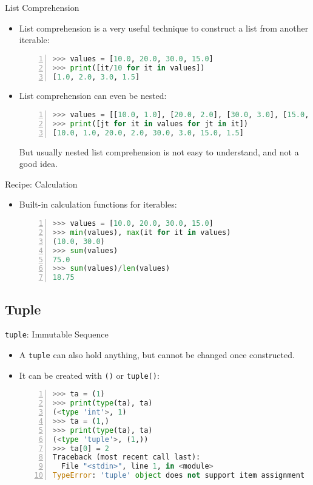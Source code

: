 \documentclass[dvips,xcolor=pst,14pt]{beamer}
\begin{document}
\begin{frame}[fragile]{
%
List Comprehension
%
}
\begin{itemize}
\item List comprehension is a very useful technique to construct a list from
another iterable:
  \begin{lstlisting}[basicstyle=\scriptsize\ttfamily,numbers=left,language=Python]
>>> values = [10.0, 20.0, 30.0, 15.0]
>>> print([it/10 for it in values])
[1.0, 2.0, 3.0, 1.5]
  \end{lstlisting}
\item List comprehension can even be nested:
  \begin{lstlisting}[basicstyle=\scriptsize\ttfamily,numbers=left,language=Python]
>>> values = [[10.0, 1.0], [20.0, 2.0], [30.0, 3.0], [15.0, 1.5]]
>>> print([jt for it in values for jt in it])
[10.0, 1.0, 20.0, 2.0, 30.0, 3.0, 15.0, 1.5]
  \end{lstlisting}
  But usually nested list comprehension is not easy to understand, and not a
  good idea.
\end{itemize}
\end{frame}

\begin{frame}[fragile]{
%
Recipe: Calculation
%
}
\begin{itemize}
\item Built-in calculation functions for iterables:
  \begin{lstlisting}[basicstyle=\scriptsize\ttfamily,numbers=left,language=Python]
>>> values = [10.0, 20.0, 30.0, 15.0]
>>> min(values), max(it for it in values)
(10.0, 30.0)
>>> sum(values)
75.0
>>> sum(values)/len(values)
18.75
  \end{lstlisting}
\end{itemize}
\end{frame}

\subsection{
Tuple
}

\begin{frame}[fragile]{
%
\texttt{tuple}: Immutable Sequence
%
}
\begin{itemize}
\item A \texttt{tuple} can also hold anything, but cannot be changed once
constructed.
\item It can be created with \texttt{()} or \texttt{tuple()}:
  \begin{lstlisting}[basicstyle=\scriptsize\ttfamily,numbers=left,language=Python]
>>> ta = (1)
>>> print(type(ta), ta)
(<type 'int'>, 1)
>>> ta = (1,)
>>> print(type(ta), ta)
(<type 'tuple'>, (1,))
>>> ta[0] = 2
Traceback (most recent call last):
  File "<stdin>", line 1, in <module>
TypeError: 'tuple' object does not support item assignment
  \end{lstlisting}
\end{itemize}
\end{frame}
\end{document}
